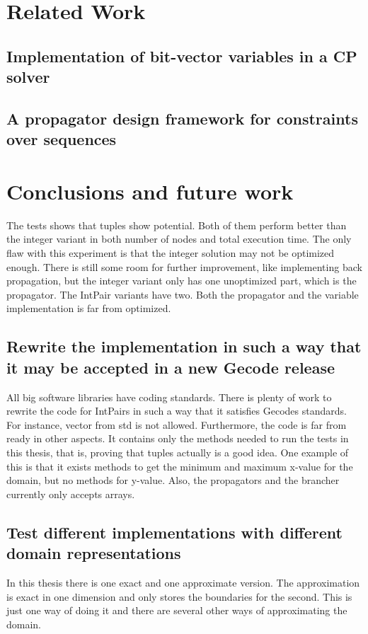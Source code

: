 \documentclass[a4paper,11pt]{article}
\begin{document}
\section{Related Work}
\subsection{Implementation of bit-vector variables in a CP solver}
\subsection{A propagator design framework for constraints over sequences}

\section{Conclusions and future work}
The tests shows that tuples show potential. Both of them perform better than the integer variant in both number of nodes and total execution time. The only flaw with this experiment is that the integer solution may not be optimized enough. There is still some room for further improvement, like implementing back propagation, but the integer variant only has one unoptimized part, which is the propagator. The IntPair variants have two. Both the propagator and the variable implementation is far from optimized. 

\subsection{Rewrite the implementation in such a way that it may be accepted in a new Gecode release}
All big software libraries have coding standards. There is plenty of work to rewrite the code for IntPairs in such a way that it satisfies Gecodes standards. For instance, vector from std is not allowed. Furthermore, the code is far from ready in other aspects. It contains only the methods needed to run the tests in this thesis, that is, proving that tuples actually is a good idea. One example of this is that it exists methods to get the minimum and maximum x-value for the domain, but no methods for y-value. Also, the propagators and the brancher currently only accepts arrays.

\subsection{Test different implementations with different domain representations}
In this thesis there is one exact and one approximate version. The approximation is exact in one dimension and only stores the boundaries for the second. This is just one way of doing it and there are several other ways of approximating the domain.
\end{document}
